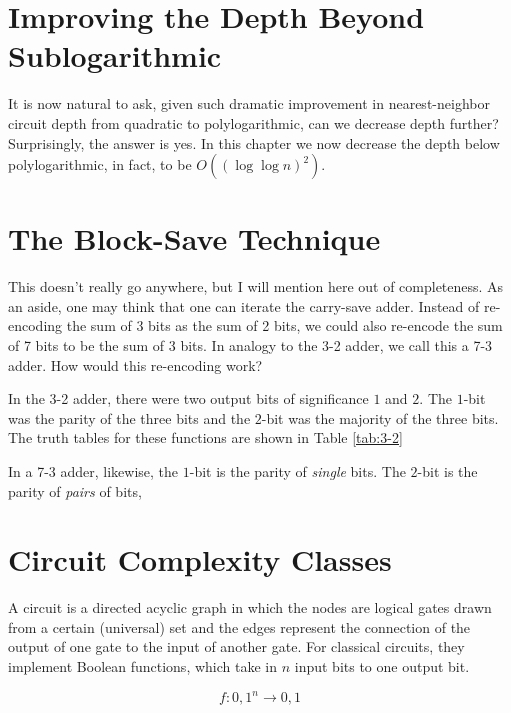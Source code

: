 \section{Improving the Depth Beyond Sublogarithmic}

It is now natural to ask, given such dramatic improvement in
nearest-neighbor circuit
depth from quadratic \cite{Kutin2006} to polylogarithmic, can we
decrease depth further? Surprisingly, the answer is yes. In this
chapter we now decrease the depth below polylogarithmic, in fact,
to be $O((\log \log n)^2)$.

\section{The Block-Save Technique}

This doesn't really go anywhere, but I will mention here out of
completeness.
As an aside, one may think that one can iterate the carry-save
adder. Instead of re-encoding the sum of 3 bits as the sum of
2 bits, we could also re-encode the sum of 7 bits to be the
sum of 3 bits. In analogy to the 3-2 adder, we call this a 7-3 adder.
How would this re-encoding work?

In the 3-2 adder, there were two output bits of significance $1$
and $2$. The $1$-bit was the parity of the three bits and
the $2$-bit was the majority of the three bits. The truth tables
for these functions are shown in Table \ref{tab:3-2}

\begin{tabular}
\caption{Truth tables for}
\label{tab:3-2}
\end{tabular}

 In a 7-3 adder,
likewise, the $1$-bit is the parity of \emph{single} bits.
The $2$-bit is the parity of \emph{pairs} of bits, 

\section{Circuit Complexity Classes}

A circuit is a directed acyclic graph in which the nodes are
logical gates drawn from a certain (universal) set and the edges 
represent
the connection of the output of one gate to the input of another
gate. For classical circuits, they implement Boolean functions, which take in $n$ input
bits to one output bit.

\begin{equation}
f:{0,1}^n \rightarrow {0,1}
\end{equation}

